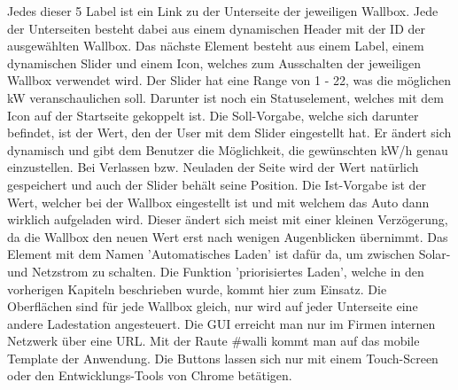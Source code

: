 Jedes dieser 5 Label ist ein Link zu der Unterseite der jeweiligen Wallbox. Jede der Unterseiten besteht dabei aus einem dynamischen Header mit der ID der ausgewählten Wallbox. Das nächste Element besteht aus einem Label, einem dynamischen Slider und einem Icon, welches zum Ausschalten der jeweiligen Wallbox verwendet wird. Der Slider hat eine Range von 1 - 22, was die möglichen kW veranschaulichen soll. Darunter ist noch ein Statuselement, welches mit dem Icon auf der Startseite gekoppelt ist. Die Soll-Vorgabe, welche sich darunter befindet, ist der Wert, den der User mit dem Slider eingestellt hat. Er ändert sich dynamisch und gibt dem Benutzer die Möglichkeit, die gewünschten kW/h genau einzustellen. Bei Verlassen bzw. Neuladen der Seite wird der Wert natürlich gespeichert und auch der Slider behält seine Position. Die Ist-Vorgabe ist der Wert, welcher bei der Wallbox eingestellt ist und mit welchem das Auto dann wirklich aufgeladen wird. Dieser ändert sich meist mit einer kleinen Verzögerung, da die Wallbox den neuen Wert erst nach wenigen Augenblicken übernimmt. Das Element mit dem Namen 'Automatisches Laden' ist dafür da, um zwischen Solar- und Netzstrom zu schalten. Die Funktion 'priorisiertes Laden', welche in den vorherigen Kapiteln beschrieben wurde, kommt hier zum Einsatz. Die Oberflächen sind für jede Wallbox gleich, nur wird auf jeder Unterseite eine andere Ladestation angesteuert. Die GUI erreicht man nur im Firmen internen Netzwerk über eine URL. Mit der Raute \#walli kommt man auf das mobile Template der Anwendung. Die Buttons lassen sich nur mit einem Touch-Screen oder den Entwicklungs-Tools von Chrome betätigen.


